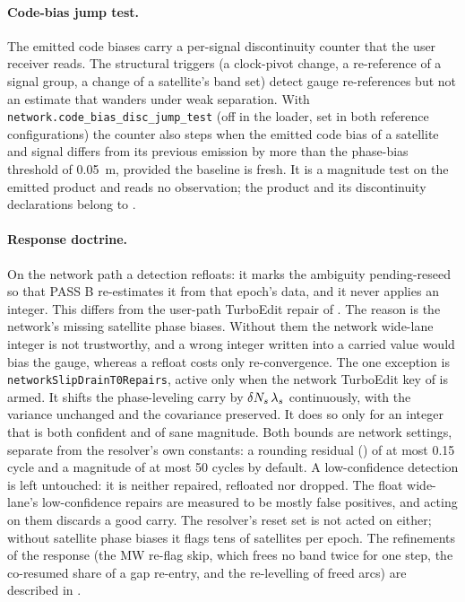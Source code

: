 \documentclass[main.tex]{subfiles}
\begin{document}
\paragraph{Code-bias jump test.}
The emitted code biases carry a per-signal discontinuity counter that the
user receiver reads.  The structural triggers (a clock-pivot change, a
re-reference of a signal group, a change of a satellite's band set) detect
gauge re-references but not an estimate that wanders under weak separation.
With \texttt{network.code\_bias\_disc\_jump\_test} (off in the loader, set in
both reference configurations) the counter also steps when the emitted code
bias of a satellite and signal differs from its previous emission by more than the
phase-bias threshold of \SI{0.05}{m}, provided the baseline is fresh.  It is a
magnitude test on the emitted product and reads no observation; the
product and its discontinuity declarations belong to
.

\paragraph{Response doctrine.}
On the network path a detection refloats: it marks the ambiguity
pending-reseed so that PASS B re-estimates it from that epoch's data,
and it never applies an integer.  This differs from the user-path
TurboEdit repair of .  The reason is the
network's missing satellite phase biases.  Without them the network
wide-lane integer is not trustworthy, and a wrong integer written into a
carried value would bias the gauge, whereas a refloat costs only
re-convergence.  The one exception is \texttt{networkSlipDrainT0Repairs},
active only when the network TurboEdit key of 
is armed.  It shifts the phase-leveling carry by
$\delta N_s\,\lambda_s$ continuously, with the variance
unchanged and the covariance preserved.  It does so only for an integer
that is both confident and of sane magnitude.  Both bounds are network
settings, separate from the resolver's own constants: a rounding residual
() of at most 0.15 cycle and a magnitude of at most
50 cycles by default.
A low-confidence detection is left untouched: it is neither repaired,
refloated nor dropped.  The float wide-lane's low-confidence repairs are
measured to be mostly false positives, and acting on them discards a
good carry.  The resolver's reset set is not acted on either; without
satellite phase biases it flags tens of satellites per epoch.  The refinements
of the response (the MW re-flag skip, which frees no band twice for one step,
the co-resumed share of a gap re-entry, and the re-levelling of freed arcs) are
described in .
\end{document}

